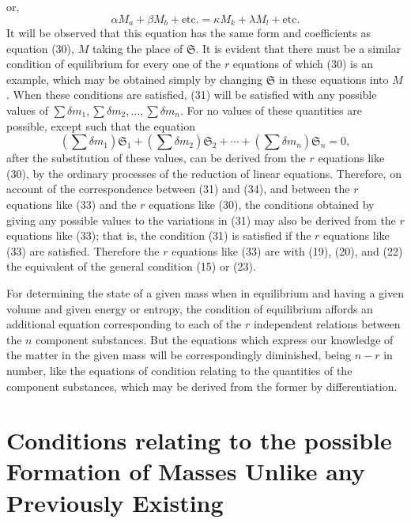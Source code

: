 \documentclass[11pt]{article}
\newcommand{\unit}[1]{\mathfrak{S}_{#1}}
\begin{document}
or,
\begin{equation}
\alpha M_a+\beta M_b+\text{etc.}=\kappa M_k+\lambda M_l+\text{etc.}
\end{equation}
It will be observed that this equation has the same form and coefficients as equation (30), \(M\) taking the place of \(\mathfrak S\). It is evident that there must be a similar condition of equilibrium for every one of the \(r\) equations of which (30) is an example, which may be obtained simply by changing \(\mathfrak S\) in these equations into \(M\). When these conditions are satisfied, (31) will be satisfied with any possible values of \(\sum\delta m_1,\sum\delta m_2,\ldots,\sum\delta m_n\). For no values of these quantities are possible, except such that the equation
\begin{equation}
(\sum\delta m_1)\unit{1}+(\sum\delta m_2)\unit{2}+\cdots+(\sum\delta m_n)\unit{n}=0,
\end{equation}
after the substitution of these values, can be derived from the \(r\) equations like (30), by the ordinary processes of the reduction of linear equations. Therefore, on account of the correspondence between (31) and (34), and between the \(r\) equations like (33) and the \(r\) equations like (30), the conditions obtained by giving any possible values to the variations in (31) may also be derived from the \(r\) equations like (33); that is, the condition (31) is satisfied if the \(r\) equations like (33) are satisfied. Therefore the \(r\) equations like (33) are with (19), (20), and (22) the equivalent of the general condition (15) or (23).

For determining the state of a given mass when in equilibrium and having a given volume and given energy or entropy, the condition of equilibrium affords an additional equation corresponding to each of the \(r\) independent relations between the \(n\) component substances. But the equations which express our knowledge of the matter in the given mass will be correspondingly diminished, being \(n-r\) in number, like the equations of condition relating to the quantities of the component substances, which may be derived from the former by differentiation.

\section*{Conditions relating to the possible Formation of Masses Unlike any Previously Existing}
\end{document}
